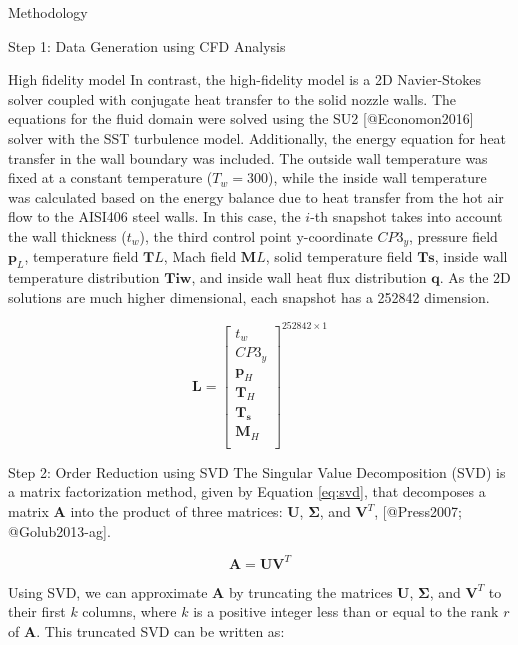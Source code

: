 \begin{frame}{Methodology}
\begin{block}{Step 1: Data Generation using CFD Analysis}
\begin{block}{High fidelity model}
\protect\hypertarget{high-fidelity-model}{}
In contrast, the high-fidelity model is a 2D Navier-Stokes solver
coupled with conjugate heat transfer to the solid nozzle walls. The
equations for the fluid domain were solved using the SU2
{[}@Economon2016{]} solver with the SST turbulence model. Additionally,
the energy equation for heat transfer in the wall boundary was included.
The outside wall temperature was fixed at a constant temperature
(\(T_w=300\)), while the inside wall temperature was calculated based on
the energy balance due to heat transfer from the hot air flow to the
AISI406 steel walls. In this case, the \(i\)-th snapshot takes into
account the wall thickness (\(t_w\)), the third control point
y-coordinate \(CP3_y\), pressure field \(\mathbf{p}_L\), temperature
field \(\mathbf{T}L\), Mach field \(\mathbf{M}L\), solid temperature
field \(\mathbf{T{s}}\), inside wall temperature distribution
\(\mathbf{T{iw}}\), and inside wall heat flux distribution
\(\mathbf{q}\). As the 2D solutions are much higher dimensional, each
snapshot has a 252842 dimension.

\[\mathbf{L} = \begin{bmatrix}
    t_w \\
    CP3_y \\
    \mathbf{p}_H\\
    \mathbf{T}_H \\
    \mathbf{T_s} \\
    \mathbf{M}_H \\
\end{bmatrix}^{252842 \times 1 }
    \label{eq:H_snapshot_matrix}\]
\end{block}
\end{block}

\begin{block}{Step 2: Order Reduction using SVD}
\protect\hypertarget{step-2-order-reduction-using-svd}{}
The Singular Value Decomposition (SVD) is a matrix factorization method,
given by Equation \protect\hyperlink{eq:svd}{{[}eq:svd{]}}, that
decomposes a matrix \(\mathbf{A}\) into the product of three matrices:
\(\mathbf{U}\), \(\mathbf{\Sigma}\), and \(\mathbf{V}^T\),
{[}@Press2007; @Golub2013-ag{]}.

\[\mathbf{A} = \mathbf{U} \mathbf{V}^T
\label{eq:svd}\]

Using SVD, we can approximate \(\mathbf{A}\) by truncating the matrices
\(\mathbf{U}\), \(\mathbf{\Sigma}\), and \(\mathbf{V}^T\) to their first
\(k\) columns, where \(k\) is a positive integer less than or equal to
the rank \(r\) of \(\mathbf{A}\). This truncated SVD can be written as:


\end{block}
\end{frame}
